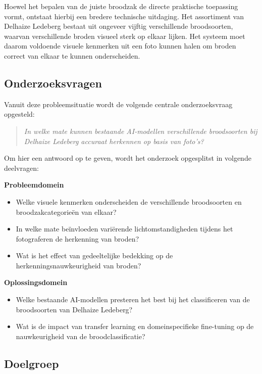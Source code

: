 Hoewel het bepalen van de juiste broodzak de directe praktische toepassing vormt, ontstaat hierbij een bredere technische uitdaging. Het assortiment van Delhaize Ledeberg bestaat uit ongeveer vijftig verschillende broodsoorten, waarvan verschillende broden visueel sterk op elkaar lijken. Het systeem moet daarom voldoende visuele kenmerken uit een foto kunnen halen om broden correct van elkaar te kunnen onderscheiden.

\subsection{Onderzoeksvragen}

Vanuit deze probleemsituatie wordt de volgende centrale onderzoeksvraag opgesteld:

\begin{quote}
\raggedright\itshape{}
In welke mate kunnen bestaande AI-modellen verschillende broodsoorten bij Delhaize Ledeberg accuraat herkennen op basis van foto's?
\end{quote}

Om hier een antwoord op te geven, wordt het onderzoek opgesplitst in volgende deelvragen:

\medskip\noindent\textbf{Probleemdomein}\par\nopagebreak\smallskip
\begin{itemize}\raggedright
\item Welke visuele kenmerken onderscheiden de verschillende broodsoorten en broodzakcategorieën van elkaar?
\item In welke mate beïnvloeden variërende lichtomstandigheden tijdens het fotograferen de herkenning van broden?
\item Wat is het effect van gedeeltelijke bedekking op de herkenningsnauwkeurigheid van broden?
\end{itemize}

\medskip\noindent\textbf{Oplossingsdomein}\par\nopagebreak\smallskip
\begin{itemize}\raggedright
\item Welke bestaande AI-modellen presteren het best bij het classificeren van de broodsoorten van Delhaize Ledeberg?
\item Wat is de impact van transfer learning en domeinspecifieke fine-tuning op de nauwkeurigheid van de broodclassificatie?
\end{itemize}

\subsection{Doelgroep}

